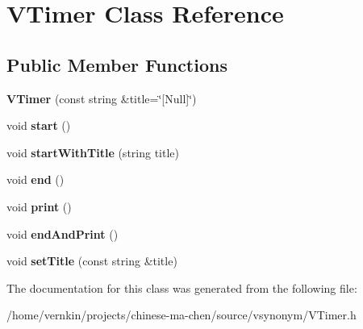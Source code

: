 \section{VTimer Class Reference}
\label{classVTimer}
\subsection*{Public Member Functions}
\begin{DoxyCompactItemize}
\item 
{\bfseries VTimer} (const string \&title=\char`\"{}[Null]\char`\"{})\label{classVTimer_a63223e03ad6f1e98cb2330fdaef5229f}

\item 
void {\bfseries start} ()\label{classVTimer_aaee046b713fa7922f545f9b558fc9de3}

\item 
void {\bfseries startWithTitle} (string title)\label{classVTimer_af99fd698a733a3369ffb2f90469d35f2}

\item 
void {\bfseries end} ()\label{classVTimer_a8401679353c0381a75f0914f60cffe63}

\item 
void {\bfseries print} ()\label{classVTimer_a595d44de9ec4a248e6b9a516d34358b6}

\item 
void {\bfseries endAndPrint} ()\label{classVTimer_a67764bab3773b0fdebcaa84d09ab5668}

\item 
void {\bfseries setTitle} (const string \&title)\label{classVTimer_a7774471469f61117a60439ba23fbcde8}

\end{DoxyCompactItemize}


The documentation for this class was generated from the following file:\begin{DoxyCompactItemize}
\item 
/home/vernkin/projects/chinese-\/ma-\/chen/source/vsynonym/VTimer.h\end{DoxyCompactItemize}
